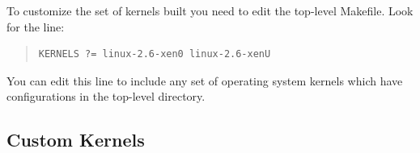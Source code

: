 \documentclass[11pt,twoside,final,openright]{report}
\begin{document}

To customize the set of kernels built you need to edit the top-level
Makefile. Look for the line:
\begin{quote}
\begin{verbatim}
KERNELS ?= linux-2.6-xen0 linux-2.6-xenU
\end{verbatim}
\end{quote}

You can edit this line to include any set of operating system kernels
which have configurations in the top-level 
directory.




\subsection{Custom Kernels}
\end{document}
